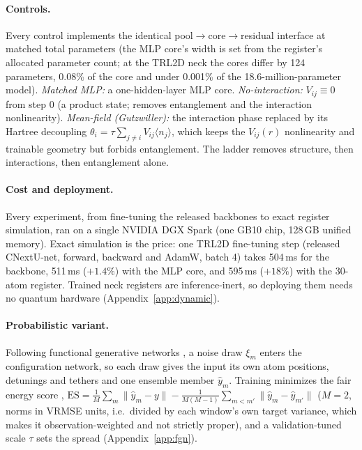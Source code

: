 \documentclass{article}
\begin{document}
\paragraph{Controls.} Every control implements the identical pool$\to$core$\to$residual interface at matched total
parameters (the MLP core's width is set from the register's allocated parameter count; at the TRL2D neck the cores
differ by 124 parameters, 0.08\% of the core and under 0.001\% of the 18.6-million-parameter model). \emph{Matched MLP:} a one-hidden-layer MLP core. \emph{No-interaction:} $V_{ij}\equiv 0$ from step 0 (a product state; removes
entanglement and the interaction nonlinearity). \emph{Mean-field (Gutzwiller):} the interaction phase replaced by its
Hartree decoupling $\theta_i = \tau\sum_{j\ne i} V_{ij}\langle n_j\rangle$, which keeps the $V_{ij}(r)$ nonlinearity and
trainable geometry but forbids entanglement. The ladder removes structure, then interactions, then entanglement alone.

\paragraph{Cost and deployment.} Every experiment, from fine-tuning the released backbones to exact register simulation, ran on a single NVIDIA DGX Spark (one GB10 chip, 128\,GB unified memory). Exact simulation is the price: one TRL2D fine-tuning step (released CNextU-net, forward, backward and AdamW, batch 4) takes 504\,ms for the backbone, 511\,ms ($+1.4\%$) with the MLP core,
and 595\,ms ($+18\%$) with the 30-atom register. Trained neck registers are inference-inert, so deploying them needs no quantum hardware (Appendix~\ref{app:dynamic}).

\paragraph{Probabilistic variant.} Following functional generative networks \citep{alet2025fgn}, a noise draw $\xi_m$
enters the configuration network, so each draw gives the input its own atom positions, detunings and tethers and one
ensemble member $\hat y_m$. Training minimizes the fair energy score \citep{gneiting2007scoring},
$\mathrm{ES}=\frac1M\sum_m\|\hat y_m-y\|-\frac{1}{M(M-1)}\sum_{m<m'}\|\hat y_m-\hat y_{m'}\|$ ($M{=}2$, norms in VRMSE
units, i.e.\ divided by each window's own target variance, which makes it observation-weighted and not strictly
proper), and a validation-tuned scale $\tau$ sets the spread (Appendix~\ref{app:fgn}).
\end{document}
